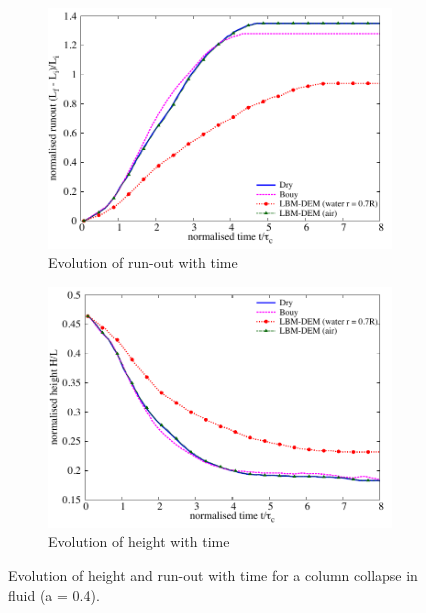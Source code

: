 \begin{figure}[htpb]
\centering
\begin{subfigure}[t]{0.9\textwidth}
\includegraphics[width=\textwidth]{Runout_a04f}
\caption{Evolution of run-out with time}
\label{fig:Runout_a04f}
\end{subfigure}

\begin{subfigure}[t]{0.9\textwidth}
\centering
\includegraphics[width=\textwidth]{Height_a04f}
\caption{Evolution of height with time}
\label{fig:Height_a04f}
\end{subfigure}
\caption{Evolution of height and run-out with time for a column collapse in 
fluid (a = 0.4).}
\label{fig:a04_run_height}
\end{figure}

